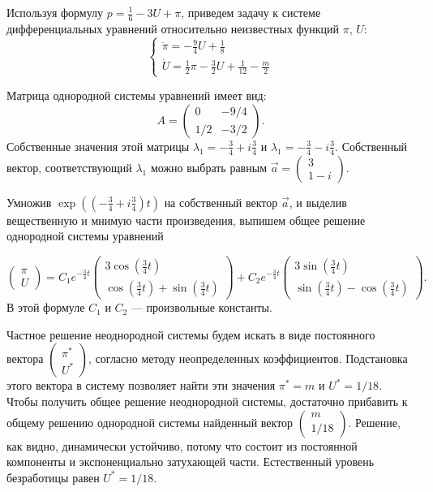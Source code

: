 \begin{solution}
Используя формулу $p=\frac{1}{6}-3U+\pi$, приведем задачу к системе дифференциальных уравнений относительно неизвестных функций $\pi$, $U$:
\[
\begin{cases}
\dot{\pi}=-\frac{9}{4}U+\frac{1}{8} \\
\dot{U}=\frac{1}{2}\pi - \frac{3}{2}U+\frac{1}{12}-\frac{m}{2}
\end{cases}
\] 
 
Матрица однородной системы уравнений имеет вид:
\[
A=\begin{pmatrix}
0 & -9/4 \\
1/2 & -3/2
\end{pmatrix}.
\]
Собственные значения этой матрицы  $\lambda_1=-\frac{3}{4}+i\frac{3}{4}$ и  $\lambda_1=-\frac{3}{4}-i\frac{3}{4}$. Собственный вектор, соответствующий $\lambda_1$  можно выбрать  равным 
$\vec{a}=\begin{pmatrix}
3 \\
1-i
\end{pmatrix}$.

Умножив  $\exp \left(  \left(- \frac{3}{4} + i \frac{3}{4}  \right)t \right)$ на собственный вектор $\vec{a}$, и выделив вещественную и мнимую части произведения, выпишем общее решение однородной системы уравнений

\[
\begin{pmatrix}
\pi \\
U
\end{pmatrix} =
C_1 e^{-\frac{3}{4}t} 
\begin{pmatrix}
3\cos \left( \frac{3}{4}t \right) \\
\cos \left( \frac{3}{4}t \right) + \sin \left( \frac{3}{4}t \right) 
\end{pmatrix}
+
C_2 e^{-\frac{3}{4}t} 
\begin{pmatrix}
3\sin \left( \frac{3}{4}t \right) \\
\sin \left( \frac{3}{4}t \right) - \cos \left( \frac{3}{4}t \right) 
\end{pmatrix}.
\]
В этой формуле $C_1$  и $C_2$  --- произвольные константы. 


Частное решение неоднородной системы будем искать в виде постоянного вектора  
$
\begin{pmatrix}
\pi^* \\
U^*
\end{pmatrix}
$,
согласно методу неопределенных коэффициентов. Подстановка этого вектора в систему позволяет найти эти значения $\pi^*=m$ и  $U^*=1/18$. 
Чтобы получить общее решение неоднородной системы, достаточно прибавить к общему решению однородной системы найденный вектор 
$
\begin{pmatrix}
m \\
1/18
\end{pmatrix}
$. Решение, как видно, динамически устойчиво, потому что состоит из постоянной компоненты и экспоненциально затухающей части. Естественный уровень безработицы равен  $U^*=1/18$.
\end{solution}

